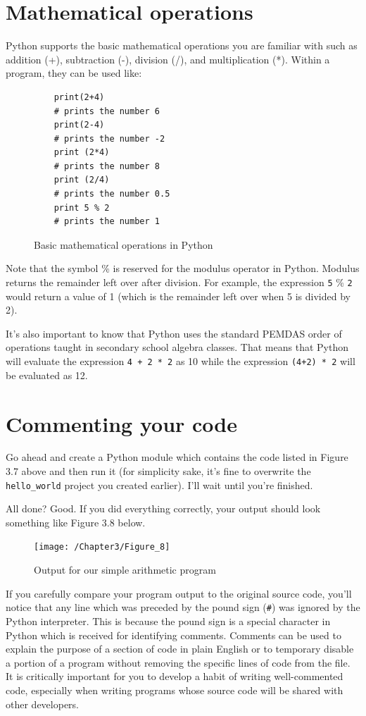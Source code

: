 \documentclass{book}
\begin{document}
\section{Mathematical operations}
Python supports the basic mathematical operations you are familiar with such as addition (+), subtraction (-), division (/), and multiplication (*). Within a program, they can be used like:

\begin{figure}[h]
	\caption{Basic mathematical operations in Python}
	\begin{lstlisting}
	print(2+4)
	# prints the number 6
	print(2-4)
	# prints the number -2
	print (2*4)
	# prints the number 8
	print (2/4)
	# prints the number 0.5
	print 5 % 2
	# prints the number 1
	\end{lstlisting}
\end{figure}
Note that the symbol \% is reserved for the modulus operator in Python. Modulus returns the remainder left over after division. For example, the expression \texttt{5} \% \texttt{2} would return a value of 1 (which is the remainder left over when 5 is divided by 2).

It's also important to know that Python uses the standard PEMDAS order of operations taught in secondary school algebra classes. That means that Python will evaluate the expression \texttt{4 + 2 * 2} as 10 while the expression \texttt{(4+2) * 2} will be evaluated as 12.

\section{Commenting your code}

Go ahead and create a Python module which contains the code listed in Figure 3.7 above and then run it (for simplicity sake, it's fine to overwrite the \texttt{hello\_world} project you created earlier). I'll wait until you're finished. 

All done? Good. If you did everything correctly, your output should look something like Figure 3.8 below.

\begin{figure}[h]
	\caption{Output for our simple arithmetic program}
	\centering\texttt{[image: /Chapter3/Figure\_8]}
\end{figure}

If you carefully compare your program output to the original source code, you'll notice that any line which was preceded by the pound sign (\texttt{\#}) was ignored by the Python interpreter. This is because the pound sign is a special character in Python which is received for identifying comments. Comments can be used to explain the purpose of a section of code in plain English or to temporary disable a portion of a program without removing the specific lines of code from the file. It is critically important for you to develop a habit of writing well-commented code, especially when writing programs whose source code will be shared with other developers.
\end{document}
